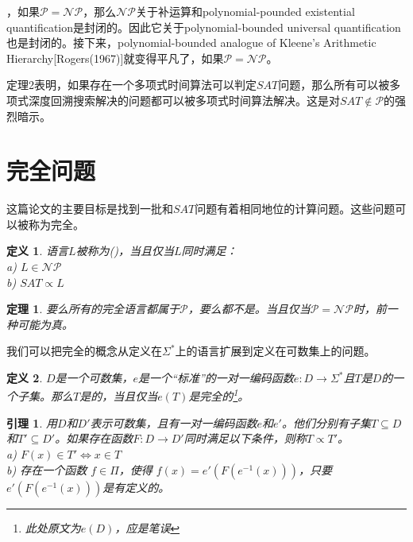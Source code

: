 \documentclass[twocolumn]{article}
\newtheorem{definition}{\hspace{2em}定义}
\newtheorem{lemma}{\hspace{2em}引理}
\newtheorem{theorem}{\hspace{2em}定理}
\theoremstyle{nonumberplain}%
\begin{document}
\begin{CJK}{UTF8}{gbsn}
    {}，如果$\mathcal{P}=\mathcal{NP}$，那么$\mathcal{NP}$关于补运算和polynomial-pounded existential quantification是封闭的。因此它关于polynomial-bounded universal quantification也是封闭的。接下来，polynomial-bounded analogue of Kleene's Arithmetic Hierarchy[Rogers(1967)]就变得平凡了，如果$\mathcal{P}=\mathcal{NP}$。

    定理2表明，如果存在一个多项式时间算法可以判定$SAT$问题，那么所有可以被多项式深度回溯搜索解决的问题都可以被多项式时间算法解决。这是对$SAT\not\in\mathcal{P}$的强烈暗示。

\section{完全问题}
    这篇论文的主要目标是找到一批和$SAT$问题有着相同地位的计算问题。这些问题可以被称为完全。
    \begin{definition}
        语言$L$被称为({}){}，当且仅当$L$同时满足：\\
        \indent a) $L\in\mathcal{NP}$\\
        \indent b) $SAT\propto L$\\
    \end{definition}

    \begin{theorem}
        要么所有的完全语言都属于$\mathcal{P}$，要么都不是。当且仅当$\mathcal{P}=\mathcal{NP}$时，前一种可能为真。
    \end{theorem}

    我们可以把完全的概念从定义在$\Sigma^*$上的语言扩展到定义在可数集上的问题。

    \begin{definition}
        $D$是一个可数集，$e$是一个“标准”的一对一编码函数$e:D\rightarrow\Sigma^*$且$T$是$D$的一个子集。那么$T$是{}的，当且仅当$e(T)$是完全的\footnote{此处原文为$e(D)$，应是笔误}。
    \end{definition}

    \begin{lemma}
        用$D$和$D'$表示可数集，且有一对一编码函数$e$和$e'$。他们分别有子集$T\subseteq D$和$T'\subseteq D'$。如果存在函数$F:D\rightarrow D'$同时满足以下条件，则称$T\propto T'$。\\
        \indent a) $F(x)\in T' \Leftrightarrow x\in T$\\
        \indent b) 存在一个函数 $f\in\Pi$，使得 $f(x)=e'(F(e^{-1}(x)))$，只要$e'(F(e^{-1}(x)))$是有定义的。\\
    \end{lemma}


\end{CJK}
\end{document}
